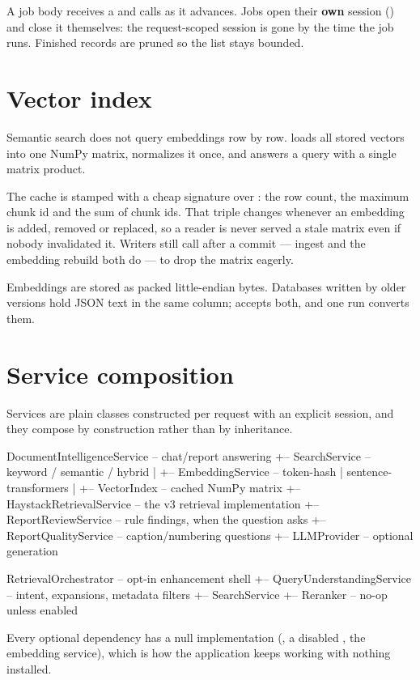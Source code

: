 A job body receives a  and calls
 as it advances. Jobs open
their \textbf{own} session () and close it themselves: the
request-scoped session is gone by the time the job runs. Finished records are
pruned so the list stays bounded.

\section{Vector index}

Semantic search does not query embeddings row by row.
 loads all stored vectors into one NumPy
matrix, normalizes it once, and answers a query with a single matrix product.

The cache is stamped with a cheap signature over : the
row count, the maximum chunk id and the sum of chunk ids. That triple changes
whenever an embedding is added, removed or replaced, so a reader is never served
a stale matrix even if nobody invalidated it. Writers still call
 after a commit --- ingest and the embedding
rebuild both do --- to drop the matrix eagerly.

Embeddings are stored as packed little-endian  bytes. Databases
written by older versions hold JSON text in the same column;
 accepts both, and one
 run converts them.

\section{Service composition}

Services are plain classes constructed per request with an explicit session, and
they compose by construction rather than by inheritance.

\begin{shellblock}
DocumentIntelligenceService     -- chat/report answering
  +-- SearchService             -- keyword / semantic / hybrid
  |     +-- EmbeddingService    -- token-hash | sentence-transformers
  |     +-- VectorIndex         -- cached NumPy matrix
  +-- HaystackRetrievalService  -- the v3 retrieval implementation
  +-- ReportReviewService       -- rule findings, when the question asks
  +-- ReportQualityService      -- caption/numbering questions
  +-- LLMProvider               -- optional generation

RetrievalOrchestrator           -- opt-in enhancement shell
  +-- QueryUnderstandingService -- intent, expansions, metadata filters
  +-- SearchService
  +-- Reranker                  -- no-op unless enabled
\end{shellblock}

Every optional dependency has a null implementation (, a
disabled , the  embedding service), which is
how the application keeps working with nothing installed.
